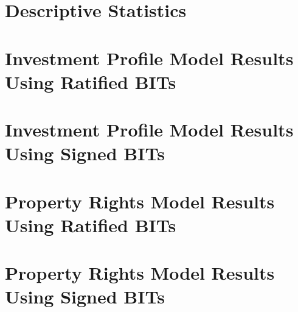 \section{Descriptive Statistics}



\newpage

\section{Investment Profile Model Results Using Ratified BITs}

  \begin{table}[h]
  \centering
  
  \end{table}
\FloatBarrier
\newpage

\section{Investment Profile Model Results Using Signed BITs}
  \begin{table}[h]
  \centering
  
  \end{table}
\FloatBarrier

\newpage

\section{Property Rights Model Results Using Ratified BITs}
  \begin{table}[h]
  \centering
  
  \end{table}
\FloatBarrier
\newpage

\section{Property Rights Model Results Using Signed BITs}
  \begin{table}[h]
  \centering
  
  \end{table}
\FloatBarrier